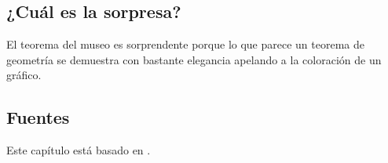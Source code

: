 \subsection*{¿Cuál es la sorpresa?}
El teorema del museo es sorprendente porque lo que parece un teorema de geometría se demuestra con bastante elegancia apelando a la coloración de un gráfico.

\subsection*{Fuentes}

Este capítulo está basado en \cite[Cap.~39]{thebook}.
